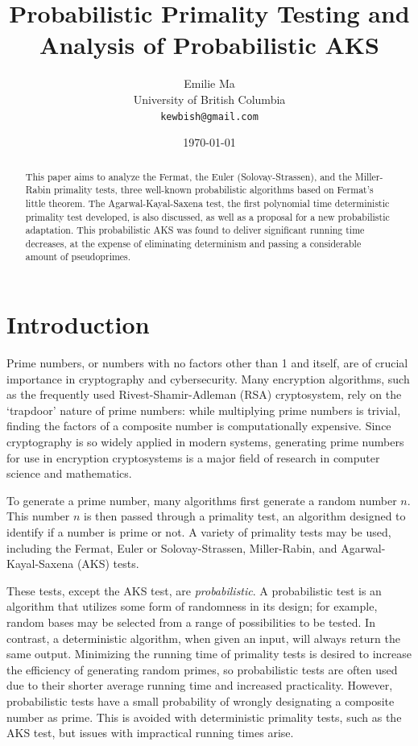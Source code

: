 \documentclass{article}
\title[Primality Testing]{Probabilistic Primality Testing and Analysis of Probabilistic AKS}
\author[Emilie Ma]{%
Emilie Ma\\%
University of British Columbia\\%
\texttt{kewbish@gmail.com}%
}
\date{\today}
\begin{document}
\maketitle
\newpage
\begin{abstract}
This paper aims to analyze the Fermat, the Euler (Solovay-Strassen), and the Miller-Rabin primality tests, three well-known probabilistic algorithms based on Fermat's little theorem. The Agarwal-Kayal-Saxena test, the first polynomial time deterministic primality test developed, is also discussed, as well as a proposal for a new probabilistic adaptation. This probabilistic AKS was found to deliver significant running time decreases, at the expense of eliminating determinism and passing a considerable amount of pseudoprimes.
\end{abstract}

\section{Introduction}
Prime numbers, or numbers with no factors other than 1 and itself, are of crucial importance in cryptography and cybersecurity. Many encryption algorithms, such as the frequently used Rivest-Shamir-Adleman (RSA) cryptosystem, rely on the `trapdoor' nature of prime numbers: while multiplying prime numbers is trivial, finding the factors of a composite number is computationally expensive. Since cryptography is so widely applied in modern systems, generating prime numbers for use in encryption cryptosystems is a major field of research in computer science and mathematics.

To generate a prime number, many algorithms first generate a random number $n$. This number $n$ is then passed through a primality test, an algorithm designed to identify if a number is prime or not. A variety of primality tests may be used, including the Fermat, Euler or Solovay-Strassen, Miller-Rabin, and Agarwal-Kayal-Saxena (AKS) tests.

These tests, except the AKS test, are \emph{probabilistic}. A probabilistic test is an algorithm that utilizes some form of randomness in its design; for example, random bases may be selected from a range of possibilities to be tested. In contrast, a deterministic algorithm, when given an input, will always return the same output. Minimizing the running time of primality tests is desired to increase the efficiency of generating random primes, so probabilistic tests are often used due to their shorter average running time and increased practicality. However, probabilistic tests have a small probability of wrongly designating a composite number as prime. This is avoided with deterministic primality tests, such as the AKS test, but issues with impractical running times arise.
\end{document}
